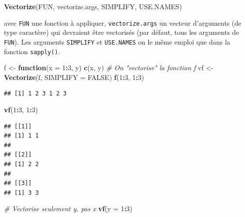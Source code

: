 \documentclass[
  11pt,
]{book}
\newenvironment{Shaded}{\begin{snugshade}}{\end{snugshade}}
\newcommand{\CommentTok}[1]{\textcolor[rgb]{0.56,0.35,0.01}{\textit{#1}}}
\newcommand{\ControlFlowTok}[1]{\textcolor[rgb]{0.13,0.29,0.53}{\textbf{#1}}}
\newcommand{\DataTypeTok}[1]{\textcolor[rgb]{0.13,0.29,0.53}{#1}}
\newcommand{\DecValTok}[1]{\textcolor[rgb]{0.00,0.00,0.81}{#1}}
\newcommand{\KeywordTok}[1]{\textcolor[rgb]{0.13,0.29,0.53}{\textbf{#1}}}
\newcommand{\NormalTok}[1]{#1}
\newcommand{\OperatorTok}[1]{\textcolor[rgb]{0.81,0.36,0.00}{\textbf{#1}}}
\newcommand{\OtherTok}[1]{\textcolor[rgb]{0.56,0.35,0.01}{#1}}
\newcommand{\StringTok}[1]{\textcolor[rgb]{0.31,0.60,0.02}{#1}}
\numberwithin{equation}{section}
\numberwithin{countremarque}{section}
\begin{document}
\begin{Shaded}
\begin{Highlighting}[]
\KeywordTok{Vectorize}\NormalTok{(FUN, vectorize.args, SIMPLIFY, USE.NAMES)}
\end{Highlighting}
\end{Shaded}

avec \texttt{FUN} une fonction à appliquer, \texttt{vectorize.args} un vecteur d'arguments (de type caractère) qui devraient être vectorisés (par défaut, tous les arguments de \texttt{FUN}). Les arguments \texttt{SIMPLIFY} et \texttt{USE.NAMES} on le même emploi que dans la fonction \texttt{sapply()}.

\begin{Shaded}
\begin{Highlighting}[]
\NormalTok{f \textless{}{-}}\StringTok{ }\ControlFlowTok{function}\NormalTok{(}\DataTypeTok{x =} \DecValTok{1}\OperatorTok{:}\DecValTok{3}\NormalTok{, y) }\KeywordTok{c}\NormalTok{(x, y)}
\CommentTok{\# On "vectorise" la fonction f}
\NormalTok{vf \textless{}{-}}\StringTok{ }\KeywordTok{Vectorize}\NormalTok{(f, }\DataTypeTok{SIMPLIFY =} \OtherTok{FALSE}\NormalTok{)}
\KeywordTok{f}\NormalTok{(}\DecValTok{1}\OperatorTok{:}\DecValTok{3}\NormalTok{, }\DecValTok{1}\OperatorTok{:}\DecValTok{3}\NormalTok{)}
\end{Highlighting}
\end{Shaded}

\begin{lstlisting}
## [1] 1 2 3 1 2 3
\end{lstlisting}

\begin{Shaded}
\begin{Highlighting}[]
\KeywordTok{vf}\NormalTok{(}\DecValTok{1}\OperatorTok{:}\DecValTok{3}\NormalTok{, }\DecValTok{1}\OperatorTok{:}\DecValTok{3}\NormalTok{)}
\end{Highlighting}
\end{Shaded}

\begin{lstlisting}
## [[1]]
## [1] 1 1
## 
## [[2]]
## [1] 2 2
## 
## [[3]]
## [1] 3 3
\end{lstlisting}

\begin{Shaded}
\begin{Highlighting}[]
\CommentTok{\# Vectorise seulement y, pas x}
\KeywordTok{vf}\NormalTok{(}\DataTypeTok{y =} \DecValTok{1}\OperatorTok{:}\DecValTok{3}\NormalTok{)}
\end{Highlighting}
\end{Shaded}
\end{document}
